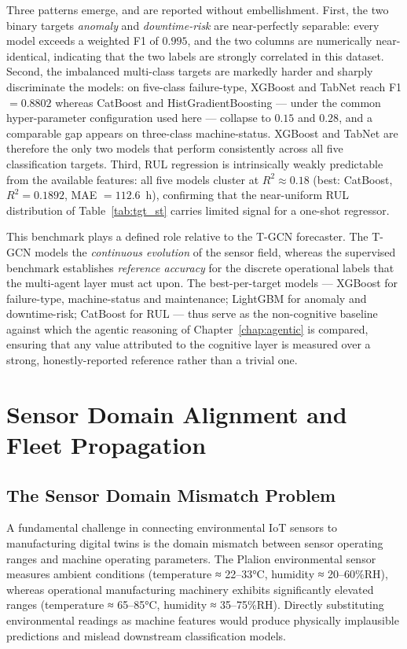 Three patterns emerge, and are reported without embellishment. First, the two
binary targets \emph{anomaly} and \emph{downtime-risk} are near-perfectly
separable: every model exceeds a weighted F1 of $0.995$, and the two columns
are numerically near-identical, indicating that the two labels are strongly
correlated in this dataset. Second, the imbalanced multi-class targets are
markedly harder and sharply discriminate the models: on five-class
failure-type, XGBoost and TabNet reach F1 $=0.8802$ whereas CatBoost and
HistGradientBoosting --- under the common hyper-parameter configuration used
here --- collapse to $0.15$ and $0.28$, and a comparable gap appears on
three-class machine-status. XGBoost and TabNet are therefore the only two
models that perform consistently across all five classification targets.
Third, RUL regression is intrinsically weakly predictable from the available
features: all five models cluster at $R^2 \approx 0.18$ (best: CatBoost,
$R^2 = 0.1892$, MAE $= 112.6$~h), confirming that the near-uniform RUL
distribution of Table~\ref{tab:tgt_st} carries limited signal for a one-shot
regressor.

This benchmark plays a defined role relative to the T-GCN forecaster. The
T-GCN models the \emph{continuous evolution} of the sensor field, whereas the
supervised benchmark establishes \emph{reference accuracy} for the discrete
operational labels that the multi-agent layer must act upon. The
best-per-target models --- XGBoost for failure-type, machine-status and
maintenance; LightGBM for anomaly and downtime-risk; CatBoost for RUL --- thus
serve as the non-cognitive baseline against which the agentic reasoning of
Chapter~\ref{chap:agentic} is compared, ensuring that any value attributed to
the cognitive layer is measured over a strong, honestly-reported reference
rather than a trivial one.

\section{Sensor Domain Alignment and Fleet Propagation}
\subsection{The Sensor Domain Mismatch Problem}
A fundamental challenge in connecting environmental IoT sensors to manufacturing digital twins is the domain mismatch between sensor operating ranges and machine operating parameters. The Plalion environmental sensor measures ambient conditions (temperature ≈ 22–33°C, humidity ≈ 20–60\%RH), whereas operational manufacturing machinery exhibits significantly elevated ranges (temperature ≈ 65–85°C, humidity ≈ 35–75\%RH). Directly substituting environmental readings as machine features would produce physically implausible predictions and mislead downstream classification models.

